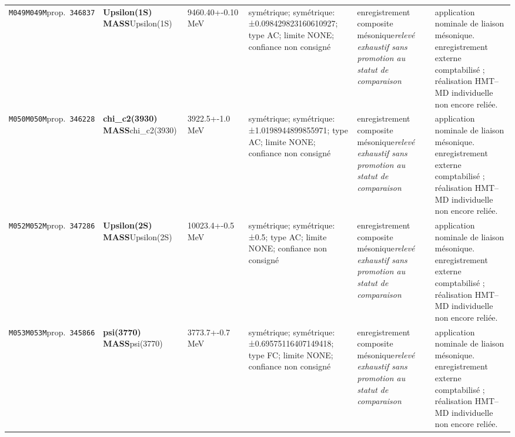 \begin{landscape}
\begin{longtable}{L{1.85cm}L{4.45cm}L{2.35cm}L{4.05cm}L{3.35cm}L{7.15cm}}
\texttt{M049}\newline \texttt{M049M}\newline prop.\ \texttt{346837} & \textbf{Upsilon(1S) MASS}\newline Upsilon(1S) & 9460.40+-0.10\,MeV & symétrique; symétrique: ±0.098429823160610927; type AC; limite NONE; confiance non consigné & enregistrement composite mésonique\newline \emph{relevé exhaustif sans promotion au statut de comparaison} & application nominale de liaison mésonique. enregistrement externe comptabilisé ; réalisation HMT--MD individuelle non encore reliée. \\
\texttt{M050}\newline \texttt{M050M}\newline prop.\ \texttt{346228} & \textbf{chi\_\allowbreak{}c2(3930) MASS}\newline chi\_\allowbreak{}c2(3930) & 3922.5+-1.0\,MeV & symétrique; symétrique: ±1.0198944899855971; type AC; limite NONE; confiance non consigné & enregistrement composite mésonique\newline \emph{relevé exhaustif sans promotion au statut de comparaison} & application nominale de liaison mésonique. enregistrement externe comptabilisé ; réalisation HMT--MD individuelle non encore reliée. \\
\texttt{M052}\newline \texttt{M052M}\newline prop.\ \texttt{347286} & \textbf{Upsilon(2S) MASS}\newline Upsilon(2S) & 10023.4+-0.5\,MeV & symétrique; symétrique: ±0.5; type AC; limite NONE; confiance non consigné & enregistrement composite mésonique\newline \emph{relevé exhaustif sans promotion au statut de comparaison} & application nominale de liaison mésonique. enregistrement externe comptabilisé ; réalisation HMT--MD individuelle non encore reliée. \\
\texttt{M053}\newline \texttt{M053M}\newline prop.\ \texttt{345866} & \textbf{psi(3770) MASS}\newline psi(3770) & 3773.7+-0.7\,MeV & symétrique; symétrique: ±0.69575116407149418; type FC; limite NONE; confiance non consigné & enregistrement composite mésonique\newline \emph{relevé exhaustif sans promotion au statut de comparaison} & application nominale de liaison mésonique. enregistrement externe comptabilisé ; réalisation HMT--MD individuelle non encore reliée. \\

\end{longtable}
\end{landscape}
